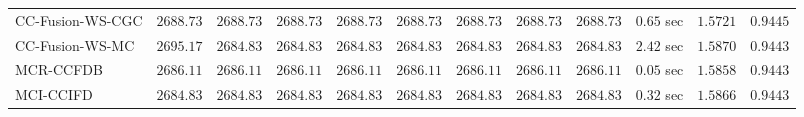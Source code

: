 \begin{table}[H]
\begin{tabular}{lrrrrrrrrrrr}
    CC-Fusion-WS-CGC & $      2688.73$ & $      2688.73$ & $      2688.73$ & $      2688.73$ & $      2688.73$ & $      2688.73$ & $      2688.73$ & $      2688.73$ & $         0.65$ sec    & $       1.5721$  & $       0.9445$ \\ 
     CC-Fusion-WS-MC & $      2695.17$ & $      2684.83$ & $      2684.83$ & $      2684.83$ & $      2684.83$ & $      2684.83$ & $      2684.83$ & $      2684.83$ & $         2.42$ sec    & $       1.5870$  & $       0.9443$ \\ 
\cmidrule{1-1} 
           MCR-CCFDB & $      2686.11$ & $      2686.11$ & $      2686.11$ & $      2686.11$ & $      2686.11$ & $      2686.11$ & $      2686.11$ & $      2686.11$ & $         0.05$ sec    & $       1.5858$  & $       0.9443$ \\ 
\cmidrule{1-1} 
           MCI-CCIFD & $      2684.83$ & $      2684.83$ & $      2684.83$ & $      2684.83$ & $      2684.83$ & $      2684.83$ & $      2684.83$ & $      2684.83$ & $         0.32$ sec    & $       1.5866$  & $       0.9443$ \\ 
\bottomrule
\end{tabular}
\end{table}

